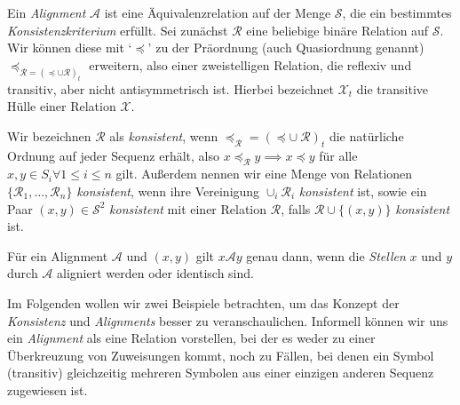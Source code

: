 \begin{definition}
	Ein \emph{Alignment} $\mathcal{A}$ ist eine Äquivalenzrelation auf der Menge $\mathcal{S}$, die ein bestimmtes \emph{Konsistenzkriterium} erfüllt. Sei zunächst $\mathcal{R}$ eine beliebige binäre Relation auf $\mathcal{S}$. Wir können diese mit `$\preceq$' zu der Präordnung (auch Quasiordnung genannt) $\preceq_{\mathcal{R}=(\preceq \cup \mathcal{R})_t}$ erweitern, also einer zweistelligen Relation, die reflexiv und transitiv, aber nicht antisymmetrisch ist. Hierbei bezeichnet $\mathcal{X}_t$ die transitive Hülle einer Relation $\mathcal{X}$. 
	
	Wir bezeichnen $\mathcal{R}$ als \emph{konsistent}, wenn $\preceq_{\mathcal{R}}=(\preceq \cup\: \mathcal{R})_t$ die natürliche Ordnung auf jeder Sequenz erhält, also $x \preceq_{\mathcal{R}} y \implies x \preceq y$ für alle $x,y \in S_i \forall 1\leq i\leq n$ gilt. Außerdem nennen wir eine Menge von Relationen $\{\mathcal{R}_1, \dots, \mathcal{R}_n\}$ \emph{konsistent}, wenn ihre Vereinigung $\cup_i \mathcal{R}_i$ \emph{konsistent} ist, sowie ein Paar $(x,y) \in \mathcal{S}^2$ \emph{konsistent} mit einer Relation $\mathcal{R}$, falls $\mathcal{R} \cup \{(x,y)\}$ \emph{konsistent} ist.
	
	Für ein Alignment $\mathcal{A}$ und $(x,y)$ gilt $x\mathcal{A}y$ genau dann, wenn die \emph{Stellen} $x$ und $y$ durch $\mathcal{A}$ aligniert werden oder identisch sind.
\end{definition}

Im Folgenden wollen wir zwei Beispiele betrachten, um das Konzept der \emph{Konsistenz} und \emph{Alignments} besser zu veranschaulichen. Informell können wir uns ein \emph{Alignment} als eine Relation vorstellen, bei der es weder zu einer Überkreuzung von Zuweisungen kommt, noch zu Fällen, bei denen ein Symbol (transitiv) gleichzeitig mehreren Symbolen aus einer einzigen anderen Sequenz zugewiesen ist.

